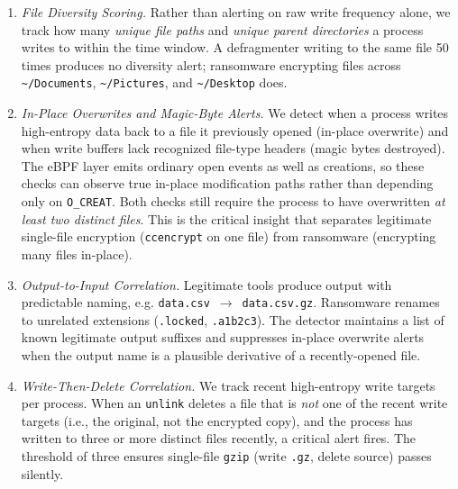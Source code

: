 \documentclass[twocolumn, 10pt]{scrartcl}
\begin{document}
\begin{enumerate}
    (i) System paths are already protected by other mechanisms. Writes to /dev/sda require root. Writes to /proc/ and /sys/ are virtual filesystems that don't store user data. /var/lib/ is protected by file permissions. A process that has root access to write to block devices has already compromised the system beyond what a user-space monitor can defend against.

    (ii) Ransomware targets user data, not system files. The business model depends on encrypting files the victim can't recreate — documents, photos, databases. System binaries and configs can be reinstalled. Real-world ransomware families (LockBit, Conti, BlackCat) overwhelmingly target /home, /srv, mounted shares, and database data directories, not /dev/ or /proc/.

    \item \textit{File Diversity Scoring.}
    Rather than alerting on raw write frequency alone, we track how many \emph{unique file paths} and \emph{unique parent directories} a process writes to within the time window. A defragmenter writing to the same file 50 times produces no diversity alert; ransomware encrypting files across \texttt{\textasciitilde/Documents}, \texttt{\textasciitilde/Pictures}, and \texttt{\textasciitilde/Desktop} does.

    \item \textit{In-Place Overwrites and Magic-Byte Alerts.}
    We detect when a process writes high-entropy data back to a file it previously opened (in-place overwrite) and when write buffers lack recognized file-type headers (magic bytes destroyed). The eBPF layer emits ordinary open events as well as creations, so these checks can observe true in-place modification paths rather than depending only on \texttt{O\_CREAT}. Both checks still require the process to have overwritten \emph{at least two distinct files}. This is the critical insight that separates legitimate single-file encryption (\texttt{ccencrypt} on one file) from ransomware (encrypting many files in-place).

    \item \textit{Output-to-Input Correlation.}
    Legitimate tools produce output with predictable naming, e.g. \texttt{data.csv}~$\to$~\texttt{data.csv.gz}. Ransomware renames to unrelated extensions (\texttt{.locked}, \texttt{.a1b2c3}). The detector maintains a list of known legitimate output suffixes and suppresses in-place overwrite alerts when the output name is a plausible derivative of a recently-opened file.

    \item \textit{Write-Then-Delete Correlation.}
    We track recent high-entropy write targets per process. When an \texttt{unlink} deletes a file that is \emph{not} one of the recent write targets (i.e., the original, not the encrypted copy), and the process has written to three or more distinct files recently, a critical alert fires. The threshold of three ensures single-file \texttt{gzip} (write \texttt{.gz}, delete source) passes silently.
\end{enumerate}
\end{document}
